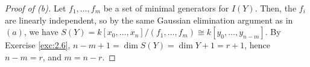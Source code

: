 \documentclass[12pt,letterpaper]{article}
\theoremstyle{definition}
\theoremstyle{remark}
\numberwithin{equation}{section}
\numberwithin{figure}{problem}
\newcommand{\PP}{\mathbb{P}}
\begin{document}
\begin{proof}[Proof of (b)]
  Let $f_1,\ldots,f_m$ be a set of minimal generators for $I(Y)$. Then, the $f_i$ are
  linearly independent, so by the same Gaussian elimination argument as in
  $(a)$, we have $S(Y) = k[x_0,\ldots,x_n]/(f_1,\ldots,f_m) \cong
  k[y_0,\ldots,y_{n-m}]$. By Exercise \ref{exc:2.6}, $n - m + 1 = \dim S(Y) =
  \dim Y + 1 = r + 1$, hence $n-m = r$, and $m = n-r$.
\end{proof}
\end{document}
